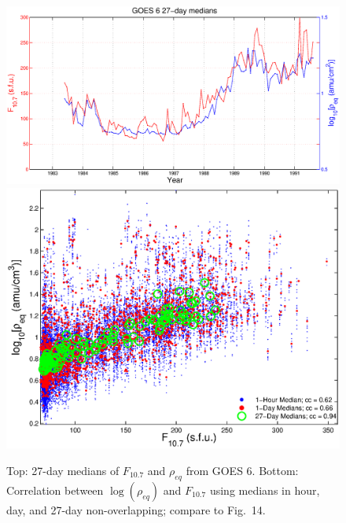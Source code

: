 \documentclass[10pt,twocolumn]{article}
\begin{document}
\begin{figure}[htp!]
\centering
\includegraphics[scale=0.40]{paperfigures/F107MD27d-GOES6.eps}
\includegraphics[scale=0.40]{paperfigures/ccplot-GOES6.eps}
\caption{Top: 27-day medians of $F_{10.7}$ and $\rho_{eq}$ from GOES 6. Bottom: Correlation between $\log(\rho_{eq})$ and $F_{10.7}$ using medians in hour, day, and 27-day non-overlapping; compare to \cite{Takahashi2010} Fig.~14.}
\label{ccplot}
\end{figure}
\clearpage
\end{document}
